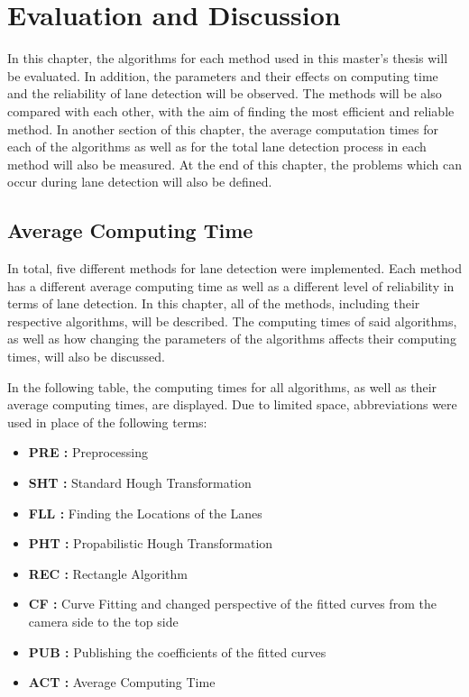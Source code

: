 
%
\chapter{Evaluation and Discussion}
\label{cha:Evaluation and Discussion}

In this chapter, the algorithms for each method used in this master's thesis will be evaluated.
In addition, the parameters and their effects on computing time and the reliability of lane
detection will be observed. The methods will be also compared with each other, with the aim
of finding the most efficient and reliable method. In another section of this chapter, the average
computation times for each of the algorithms as well as for the total lane detection process in
each method will also be measured. At the end of this chapter, the problems which can occur
during lane detection will also be defined.

%

\section{Average Computing Time}\label{sec:Average Computing Time}

In total, five different methods for lane detection were implemented. Each method has a different average computing time as well as a different level of reliability in terms of lane detection. In this chapter, all of the methods, including their respective algorithms, will be described. The computing times of said algorithms, as well as how changing the parameters of the algorithms affects their computing times, will also be discussed.


In the following table, the computing times for all algorithms, as well as their average computing times, are displayed. Due to limited space, abbreviations were used in place of the following terms:


\begin{itemize}[noitemsep]
\item\textbf{PRE : }Preprocessing
\item\textbf{SHT : }Standard Hough Transformation
\item\textbf{FLL : }Finding the Locations of the Lanes
\item\textbf{PHT : }Propabilistic Hough Transformation
\item\textbf{REC : }Rectangle Algorithm
\item\textbf{CF : }Curve Fitting and changed perspective of the fitted curves from the camera side to the top side 
\item\textbf{PUB : }Publishing the coefficients of the fitted curves
\item\textbf{ACT : }Average Computing Time
\end{itemize}


